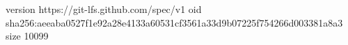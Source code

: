 version https://git-lfs.github.com/spec/v1
oid sha256:aeeaba0527f1e92a28e4133a60531cf3561a33d9b07225f754266d003381a8a3
size 10099
